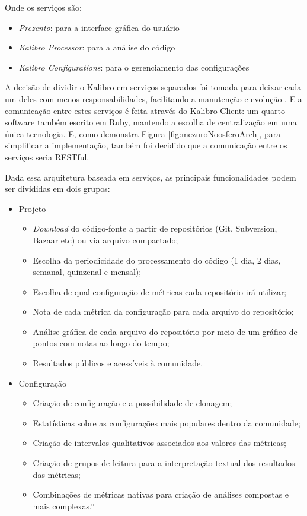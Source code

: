 \newpage

Onde os serviços são:

\begin{itemize}
  \item \textit{Prezento}: para a interface gráfica do usuário
  \item \textit{Kalibro Processor}: para a análise do código
  \item \textit{Kalibro Configurations}: para o gerenciamento das configurações
\end{itemize}

A decisão de dividir o Kalibro em serviços separados foi tomada para deixar
cada um deles com menos responsabilidades, facilitando a manutenção e evolução
\cite{camarinhaOSS2015}. E a comunicação entre estes serviços é feita através
do Kalibro Client: um quarto software também escrito em Ruby, mantendo a
escolha de centralização em uma única tecnologia. E, como demonstra Figura \ref{fig:mezuroNoosferoArch}, para simplificar a
implementação, também foi decidido que a comunicação entre os serviços seria
RESTful.

Dada essa arquitetura baseada em serviços, as principais funcionalidades podem ser
divididas em dois grupos:

\begin{itemize}
  \item Projeto
    \begin{itemize}
    \item \textit{Download} do código-fonte a partir de repositórios (Git,
    Subversion, Bazaar etc) ou via arquivo compactado;
        \item Escolha da periodicidade do processamento do código (1 dia, 2 dias,
        semanal, quinzenal e mensal);
        \item Escolha de qual configuração de métricas cada repositório irá
        utilizar;
        \item Nota de cada métrica da configuração para cada arquivo do
        repositório;
        \item Análise gráfica de cada arquivo do repositório por meio de um
        gráfico de pontos com notas ao longo do tempo;
        \item Resultados públicos e acessíveis à comunidade.
    \end{itemize}
    \item Configuração
    \begin{itemize}
    \item Criação de configuração e a possibilidade de clonagem;
        \item Estatísticas sobre as configurações mais populares dentro da
        comunidade;
        \item Criação de intervalos qualitativos associados aos valores das
        métricas;
        \item Criação de grupos de leitura para a interpretação textual dos
        resultados das métricas;
        \item Combinações de métricas nativas para criação de análises compostas
        e mais complexas.''
    \end{itemize}
\end{itemize}

